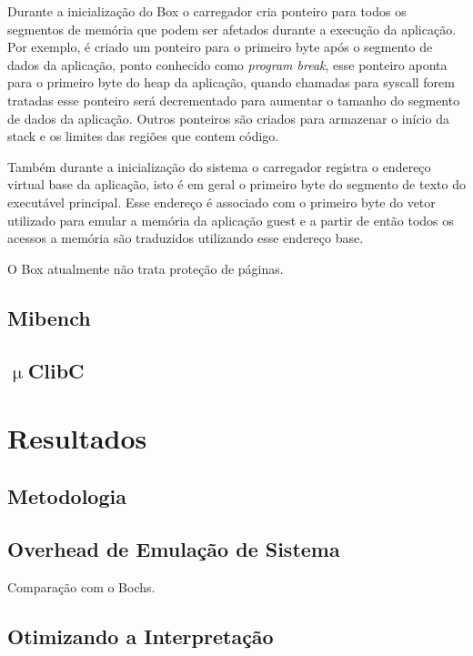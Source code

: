 \documentclass[11pt,twoside]{article}
\begin{document}
Durante a inicialização do Box o carregador cria ponteiro para todos os
segmentos de memória que podem ser afetados durante a execução da aplicação.
Por exemplo, é criado um ponteiro para o primeiro byte após o segmento de
dados da aplicação, ponto conhecido como \textit{program break}, esse 
ponteiro aponta para o primeiro byte do heap da aplicação, quando chamadas
para syscall forem tratadas esse ponteiro será decrementado para aumentar
o tamanho do segmento de dados da aplicação. Outros ponteiros são criados
para armazenar o início da stack e os limites das regiões que contem código.

Também durante a inicialização do sistema o carregador registra o endereço
virtual base da aplicação, isto é em geral o primeiro byte do segmento de
texto do executável principal. Esse endereço é associado com o primeiro
byte do vetor utilizado para emular a memória da aplicação guest e a partir
de então todos os acessos a memória são traduzidos utilizando esse endereço
base.

O Box atualmente não trata proteção de páginas.


\subsection{Mibench}

\subsection{$\upmu$ClibC}





\section{Resultados} \label{sec:resultados}

\subsection{Metodologia}

\subsection{Overhead de Emulação de Sistema}

Comparação com o Bochs.

\subsection{Otimizando a Interpretação}
\end{document}
